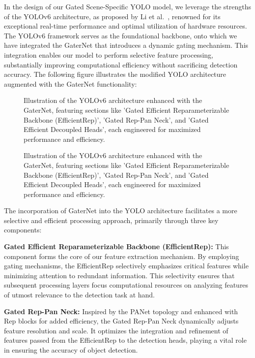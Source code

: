 In the design of our Gated Scene-Specific YOLO model, we leverage the strengths of the YOLOv6 architecture, as proposed by Li et al.~\cite{li2023yolov6,li2022yolov6}, renowned for its exceptional real-time performance and optimal utilization of hardware resources. The YOLOv6 framework serves as the foundational backbone, onto which we have integrated the GaterNet that introduces a dynamic gating mechanism. This integration enables our model to perform selective feature processing, substantially improving computational efficiency without sacrificing detection accuracy. The following figure illustrates the modified YOLO architecture augmented with the GaterNet functionality:

\begin{figure}[ht]
    \centering
    
    \caption{Illustration of the YOLOv6 architecture enhanced with the GaterNet, featuring sections like 'Gated Efficient Reparameterizable Backbone (EfficientRep)', 'Gated Rep-Pan Neck', and 'Gated Efficient Decoupled Heads', each engineered for maximized performance and efficiency.}
    \label{fig:yolo_architecture}
    \end{figure}

\begin{figure}[ht]
    \centering
    
    \caption{Illustration of the YOLOv6 architecture enhanced with the GaterNet, featuring sections like 'Gated Efficient Reparameterizable Backbone (EfficientRep)', 'Gated Rep-Pan Neck', and 'Gated Efficient Decoupled Heads', each engineered for maximized performance and efficiency.}
    \label{fig:gating_mechanism}
    \end{figure}

The incorporation of GaterNet into the YOLO architecture facilitates a more selective and efficient processing approach, primarily through three key components:

\textbf{Gated Efficient Reparameterizable Backbone (EfficientRep):} This component forms the core of our feature extraction mechanism. By employing gating mechanisms, the EfficientRep selectively emphasizes critical features while minimizing attention to redundant information. This selectivity ensures that subsequent processing layers focus computational resources on analyzing features of utmost relevance to the detection task at hand.

\textbf{Gated Rep-Pan Neck:} Inspired by the PANet topology and enhanced with Rep blocks for added efficiency, the Gated Rep-Pan Neck dynamically adjusts feature resolution and scale. It optimizes the integration and refinement of features passed from the EfficientRep to the detection heads, playing a vital role in ensuring the accuracy of object detection.

